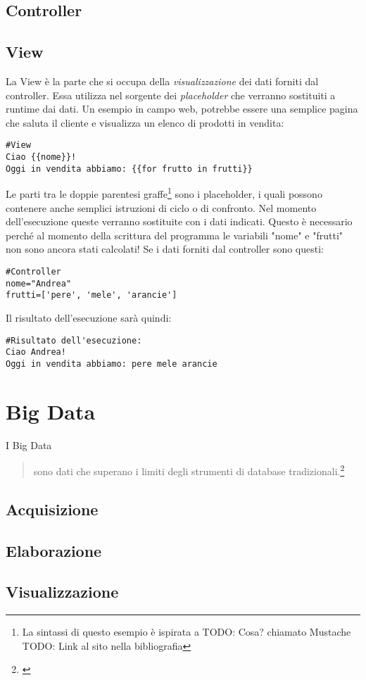 \subsection{Controller}
\subsection{View}
La View è la parte che si occupa della \emph{visualizzazione} dei dati forniti dal controller. Essa utilizza nel sorgente dei \emph{placeholder} che verranno sostituiti a runtime dai dati.
Un esempio in campo web, potrebbe essere una semplice pagina che saluta il cliente e visualizza un elenco di prodotti in vendita:
\begin{verbatim}
#View
Ciao {{nome}}!
Oggi in vendita abbiamo: {{for frutto in frutti}}
\end{verbatim}
Le parti tra le doppie parentesi graffe\footnote{La sintassi di questo esempio è ispirata a TODO: Cosa? chiamato Mustache TODO: Link al sito nella bibliografia} sono i placeholder, i quali possono contenere anche semplici istruzioni di ciclo o di confronto. Nel momento dell'esecuzione queste verranno sostituite con i dati indicati. Questo è necessario perché al momento della scrittura del programma le variabili "nome" e "frutti" non sono ancora stati calcolati!
Se i dati forniti dal controller sono questi:
\begin{verbatim}
#Controller
nome="Andrea"
frutti=['pere', 'mele', 'arancie']
\end{verbatim}
Il risultato dell'esecuzione sarà quindi:
\begin{verbatim}
#Risultato dell'esecuzione:
Ciao Andrea!
Oggi in vendita abbiamo: pere mele arancie
\end{verbatim}


\section{Big Data}\label{sec:bigdata}
I Big Data
\begin{quotation}
sono dati che superano i limiti degli strumenti di database tradizionali.\footnote{\cite{rezzani2013big}}
\end{quotation} 
\subsection{Acquisizione}
\subsection{Elaborazione}
\subsection{Visualizzazione}